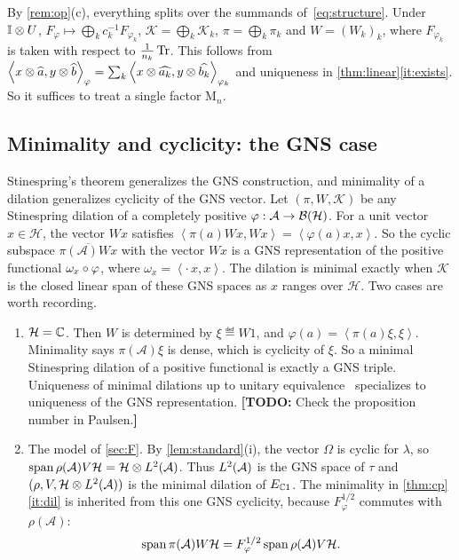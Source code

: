 \documentclass[12pt]{article}
\newcommand{\todo}[1]{\textcolor{\mysubcolor}{\small\textbf{[TODO:} #1\textbf{]}}}
\newcommand{\alg}{\mathcal{A}}             %
\newcommand{\hilb}{\mathcal{H}}            %
\newcommand{\dil}{\mathcal{K}}             %
\newcommand{\bdd}[1]{\mathcal{B}\br{#1}}   %
\newcommand{\Mn}[1]{\mathrm{M}_{#1}}       %
\newcommand{\ip}[2]{\left\langle #1 , #2 \right\rangle}
\newcommand{\ipphi}[2]{\left\langle #1 , #2 \right\rangle_{\varphi}}
\newcommand{\Ltwo}{L^2\br{\alg}}
\newcommand{\vect}[1]{\widehat{#1}}
\newcommand{\Ltn}{\hilb \tensor \Ltwo}
\newcommand{\Fphi}{F_{\varphi}}
\newcommand{\Esc}{E_{\complex 1}}          %
\begin{document}
By \cref{rem:op}(c), everything splits over the summands of~\eqref{eq:structure}.
Under \({\mathbb I} \otimes U\), \(\Fphi \mapsto \bigoplus_k c_k^{-1}F_{\varphi_k}\),
\(\dil = \bigoplus_k \dil_k\), \(\pi = \bigoplus_k \pi_k\) and
\(W = (W_k)_k\), where \(F_{\varphi_k}\) is taken with respect to
\(\frac{1}{n_k}\operatorname{Tr}\). This follows from
\(\ipphi{x \tensor \vect a}{y \tensor \vect b} = \sum_k
\ip{x \tensor \vect{a_k}}{y \tensor \vect{b_k}}_{\varphi_k}\) and uniqueness in
\cref{thm:linear}\ref{it:exists}. So it suffices to treat a single factor
\(\Mn n\).

\subsection{Minimality and cyclicity: the GNS case}
\label{sec:gns}

Stinespring's theorem generalizes the GNS construction, and minimality of a
dilation generalizes cyclicity of the GNS vector. Let \((\pi, W, \dil)\) be any
Stinespring dilation of a completely positive \(\varphi : \alg \to \bdd\hilb\).
For a unit vector \(x \in \hilb\), the vector \(Wx\) satisfies
\(\ip{\pi(a)Wx}{Wx} = \ip{\varphi(a)x}{x}\). So the cyclic subspace
\(\overline{\pi(\alg)Wx}\) with the vector \(Wx\) is a GNS representation of
the positive functional \(\omega_x \circ \varphi\), where
\(\omega_x = \ip{\cdot\,x}{x}\). The dilation is minimal exactly when \(\dil\) is
the closed linear span of these GNS spaces as \(x\) ranges over \(\hilb\).
Two cases are worth recording.
\begin{enumerate}[label=(\roman*)]
  \item \(\hilb = \complex\). Then \(W\) is determined by \(\xi \eqdef W1\), and
    \(\varphi(a) = \ip{\pi(a)\xi}{\xi}\). Minimality says \(\pi(\alg)\xi\) is
    dense, which is cyclicity of \(\xi\). So a minimal Stinespring dilation of a
    positive functional is exactly a GNS triple. Uniqueness of minimal dilations
    up to unitary equivalence~\cite[Proposition~4.2]{Paulsen2002} specializes to
    uniqueness of the GNS representation. \todo{Check the proposition number in
    Paulsen.}
  \item The model of \cref{sec:F}. By \cref{lem:standard}(i), the vector
    \(\Omega\) is cyclic for \(\lambda\), so
    \(\Span\rho(\alg)V\hilb = \Ltn\). Thus \(\Ltwo\) is the GNS space of \(\tau\)
    and \((\rho, V, \Ltn)\) is the minimal dilation of \(\Esc\). The minimality in
    \cref{thm:cp}\ref{it:dil} is inherited from this one GNS cyclicity, because
    \(\Fphi^{1/2}\) commutes with \(\rho(\alg)\):
    \[
      \Span\pi(\alg)W\hilb = \Fphi^{1/2}\Span\rho(\alg)V\hilb .
    \]
\end{enumerate}
\end{document}
